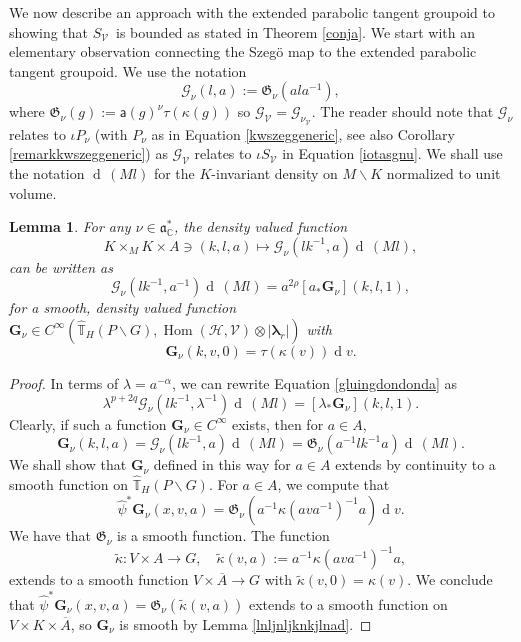 \documentclass[a4paper,reqno]{amsart}
\numberwithin{equation}{section}
\def\Hom{\operatorname{Hom}}
\def\rd{\operatorname{d}\!}
\def\C{\mathbb{C}}
\def\T{\mathbb{T}}
\newtheorem{lemma}[thm]{Lemma}
\theoremstyle{definition}
\theoremstyle{remark}
\begin{document}
We now describe an approach with the extended parabolic tangent groupoid to showing that $S_{\mathcal{V}}$ is bounded as stated in Theorem \ref{conja}. We start with an elementary observation connecting the Szegö map to the extended parabolic tangent groupoid. We use the notation 
$$\mathcal{G}_\nu(l,a):=\mathfrak{G}_\nu(ala^{-1}),$$ 
where $\mathfrak{G}_\nu(g):=\mathsf{a}(g)^{\nu}\tau(\kappa(g))$ so $\mathcal{G}_{\mathcal{V}}=\mathcal{G}_{\nu_{\mathcal{V}}}$. The reader should note that $\mathcal{G}_\nu$ relates to $\iota P_\nu$ (with $P_\nu$ as in Equation \eqref{kwszeggeneric}, see also Corollary \ref{remarkkwszeggeneric}) as $\mathcal{G}_{\mathcal{V}}$ relates to $\iota S_{\mathcal{V}}$ in Equation \eqref{iotasgnu}. We shall use the notation $\rd\,(Ml)$ for the $K$-invariant density on $M\backslash K$ normalized to unit volume.

\begin{lemma}
\label{lknlnadarrr}
For any $\nu\in \mathfrak{a}_\C^*$, the density valued function 
$$K\times_MK\times A\ni (k,l,a)\mapsto \mathcal{G}_\nu(lk^{-1},a)\rd\,(Ml),$$
can be written as
\begin{equation}
\label{gluingdondonda}
\mathcal{G}_\nu(lk^{-1},a^{-1})\rd\,(Ml)=a^{2\rho}[a_*\pmb{G}_\nu](k,l,1),
\end{equation}
for a smooth, density valued function $\pmb{G}_\nu\in C^\infty(\hat{\T}_H(P\backslash G),\Hom(\mathcal{H},\mathcal{V})\otimes |\pmb{\lambda}_r|)$ with 
$$\pmb{G}_\nu(k,v,0)=\tau(\kappa(v))\rd v.$$ 
\end{lemma}

\begin{proof}
In terms of $\lambda=a^{-\alpha}$, we can rewrite Equation \eqref{gluingdondonda} as
$$\lambda^{p+2q}\mathcal{G}_\nu(lk^{-1},\lambda^{-1})\rd\,(Ml)=[\lambda_*\pmb{G}_\nu](k,l,1).$$
Clearly, if such a function  $\pmb{G}_\nu\in C^\infty$ exists, then for $a\in A$, 
$$\pmb{G}_\nu(k,l,a)=\mathcal{G}_\nu(lk^{-1},a)\rd\,(Ml)=\mathfrak{G}_\nu(a^{-1} lk^{-1}a)\rd\,(Ml).$$ 
We shall show that $\pmb{G}_\nu$ defined in this way for $a\in A$ extends by continuity to a smooth function on $\hat{\T}_H(P\backslash G)$. For $a\in A$, we compute that 
$$\hat{\psi}^*\pmb{G}_\nu(x,v,a)=\mathfrak{G}_\nu(a^{-1}\kappa(ava^{-1})^{-1}a)\rd v.$$
We have that $\mathfrak{G}_\nu$ is a smooth function. The function 
$$\tilde{\kappa}:V\times A\to G, \quad \tilde{\kappa}(v,a):= a^{-1}\kappa(ava^{-1})^{-1}a,$$
extends to a smooth function $V\times \overline{A}\to G$ with $\tilde{\kappa}(v,0)=\kappa(v)$. We conclude that $\hat{\psi}^*\pmb{G}_\nu(x,v,a)=\mathfrak{G}_\nu(\tilde{\kappa}(v,a))$ extends to a smooth function on $V\times K\times \overline{A}$, so $\pmb{G}_\nu$ is smooth by Lemma \ref{lnljnljknkjlnad}.
\end{proof}
\end{document}
